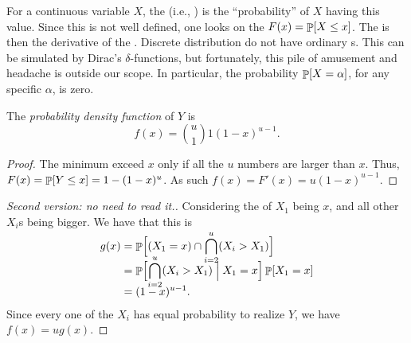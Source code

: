 For a continuous variable $X$, the  (i.e.,
\emphOnly{\pdf}\index{\pdf}) is the ``probability'' of $X$ having this
value. Since this is not well defined, one looks on the
 $F(x) = \Prob{X \leq x}$. The \pdf is then the derivative of
the \cdf.  Discrete distribution do not have ordinary \pdf{}s. This can
be simulated by Dirac's $\delta$-functions, but fortunately, this pile of
amusement and headache is outside our scope. In particular, the
probability $\Prob{X=\alpha}$, for any specific $\alpha$, is zero.

\begin{lemma}
    The \emph{probability density function} of $Y$ is
    \begin{equation*}
        f(x) = \binom{u}{1} 1 (1-x)^{u-1}.
    \end{equation*}
\end{lemma}
\begin{proof}
    The minimum exceed $x$ only if all the $u$ numbers are larger than
    $x$. Thus,
    $ F(x)=\Prob{Y \leq x } =1 - (1-x)^u$. As such
    $f(x) = F'(x) = u(1-x)^{u-1}$.
\end{proof}
\begin{proof}[Second version: no need to read it.]
    Considering the \pdf of $X_1$ being $x$, and all other $X_i$s
    being bigger. We have that this \pdf is
    \begin{align*}
        g(x)
        &=%
        \Prob{ (X_1 = x) \cap \smash{\bigcap_{i=2}^u} (X_i>X_1)\Bigr.}
        \\&=
        \ProbCond{\Bigl. \smash{\bigcap_{i=2}^u} (X_i>X_1)}{X_1=x} \Prob{X_1=x}
        \\&=%
        (1-x)^{u-1}.
    \end{align*}
    Since every one of the $X_i$ has equal probability to realize $Y$,
    we have $f(x) = u g(x)$.
\end{proof}

